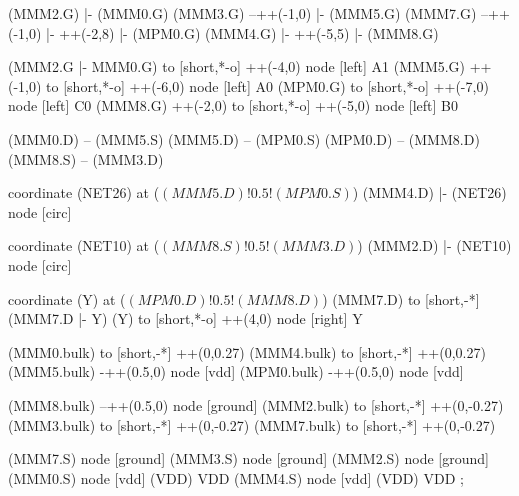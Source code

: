 \begin{circuitikz}[american]
	(MMM2.G) |- (MMM0.G)
	(MMM3.G) --++(-1,0) |- (MMM5.G)
	(MMM7.G) --++(-1,0) |- ++(-2,8) |- (MPM0.G)
	(MMM4.G) |- ++(-5,5) |- (MMM8.G)
	
	(MMM2.G |- MMM0.G) to [short,*-o] ++(-4,0) node [left] {A1}
	(MMM5.G) ++(-1,0) to [short,*-o] ++(-6,0) node [left] {A0}
	(MPM0.G) to [short,*-o] ++(-7,0) node [left] {C0}
	(MMM8.G) ++(-2,0) to [short,*-o] ++(-5,0) node [left] {B0}
	
	(MMM0.D) -- (MMM5.S)
	(MMM5.D) -- (MPM0.S)
	(MPM0.D) -- (MMM8.D)
	(MMM8.S) -- (MMM3.D)
	
	coordinate (NET26) at ($(MMM5.D)!0.5!(MPM0.S)$)
	(MMM4.D) |- (NET26) node [circ] {}
	
	coordinate (NET10) at ($(MMM8.S)!0.5!(MMM3.D)$)
	(MMM2.D) |- (NET10) node [circ] {}
	
	coordinate (Y) at ($(MPM0.D)!0.5!(MMM8.D)$)
	(MMM7.D) to [short,-*] (MMM7.D |- Y)
	(Y) to [short,*-o] ++(4,0) node [right] {Y}
	
	(MMM0.bulk) to [short,-*] ++(0,0.27)
	(MMM4.bulk) to [short,-*] ++(0,0.27)
	(MMM5.bulk) -++(0.5,0) node [vdd]{}
	(MPM0.bulk) -++(0.5,0) node [vdd]{}
	
	(MMM8.bulk) --++(0.5,0) node [ground]{}	
	(MMM2.bulk) to [short,-*] ++(0,-0.27)
	(MMM3.bulk) to [short,-*] ++(0,-0.27)
	(MMM7.bulk) to [short,-*] ++(0,-0.27)


	(MMM7.S) node [ground] {}
	(MMM3.S) node [ground] {}
	(MMM2.S) node [ground] {}
	(MMM0.S) node [vdd] (VDD) {VDD}
	(MMM4.S) node [vdd] (VDD) {VDD}
;

\end{circuitikz}
